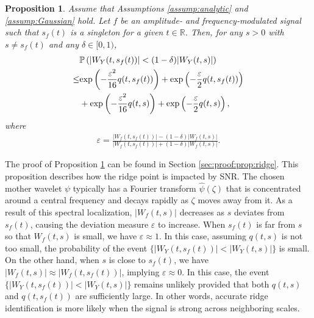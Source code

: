 \documentclass{amsart}
\newtheorem{Proposition}{Proposition}
\begin{document}
\begin{Proposition}\label{prop:ridge}
Assume that Assumptions \ref{assump:analytic} and \ref{assump:Gaussian} hold.
Let $f$ be an amplitude- and frequency-modulated signal such that $s_{f}(t)$ is a singleton for a given $t\in \mathbb{R}$.
Then, for any $s>0$ with $s\neq s_{f}(t)$ and any $\delta\in [0,1)$,
\begin{align*}
&\mathbb{P}\left(|W_{Y}(t,s_{f}(t))|<(1-\delta) |W_{Y}(t,s)|\right)
\\
\leq&
\textup{exp}\left(-\frac{\varepsilon^{2}}{16}q(t,s_{f}(t))\right)
+\textup{exp}\left(-\frac{\varepsilon}{2}q(t,s_{f}(t))\right)
\\&+\textup{exp}\left(-\frac{\varepsilon^{2}}{16}q(t,s)\right)
+\textup{exp}\left(-\frac{\varepsilon}{2}q(t,s)\right),
\end{align*}
where
\begin{align}\label{threshold}
\varepsilon=\frac{|W_{f}(t,s_{f}(t))|-(1-\delta)|W_{f}(t,s)|}{|W_{f}(t,s_{f}(t))|+(1-\delta)|W_{f}(t,s)|}.
\end{align}
\end{Proposition}
The proof of Proposition \ref{prop:ridge} can be found in Section \ref{sec:proof:prop:ridge}.
This proposition describes how the ridge point is impacted by SNR.
%
The chosen mother wavelet $\psi$ typically has a Fourier transform $\widehat{\psi}(\zeta)$
that is concentrated around a central frequency and decays rapidly as
$\zeta$ moves away from it.
As a result of this spectral localization, $|W_f(t, s)|$ decreases as $s$ deviates from $s_{f}(t)$,
causing the deviation measure $\varepsilon$ to increase.
When $s_f(t)$ is far from $s$ so that $W_f(t,s)$ is small, we have $\varepsilon\approx 1$.
In this case, assuming $q(t,s)$ is not too small,
the probability of the event $\{|W_{Y}(t,s_{f}(t))|< |W_{Y}(t,s)|\}$ is small.
On the other hand, when $s$ is close to $s_f(t)$, we have $|W_f(t,s)|\approx |W_f(t,s_f(t))|$, implying $\varepsilon\approx 0$. In this case, the event $\{|W_{Y}(t,s_{f}(t))|< |W_{Y}(t,s)|\}$ remains unlikely provided that both $q(t,s)$ and $q(t,s_f(t))$ are sufficiently large. In other words, accurate ridge identification is more likely when the signal is strong across neighboring scales.
\end{document}
